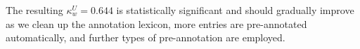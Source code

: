 The resulting $\kappa_w^U = 0.644$ is statistically significant and should gradually improve as we clean up the annotation lexicon, more entries are pre-annotated automatically, and further types of pre-annotation are employed.

